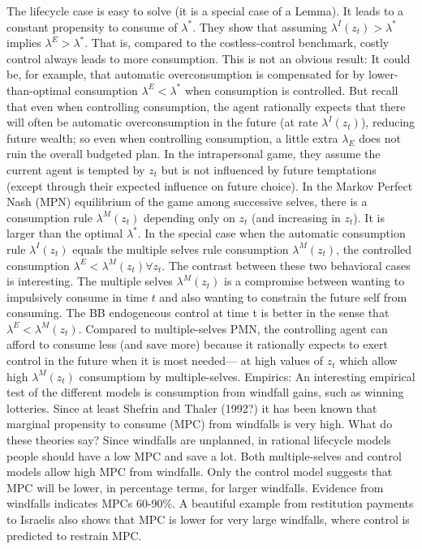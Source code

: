 \documentclass{article}
\begin{document}
The lifecycle case is easy to solve (it is a special case of a Lemma). It leads to a constant propensity to consume of $\lambda^*$. They show that assuming $\lambda^I(z_t)> \lambda^*$ implies $\lambda^E> \lambda^*$. That is, compared to the costless-control benchmark, costly control always leads to more consumption. This is not an obvious result: It could be, for example, that automatic overconsumption is compensated for by lower-than-optimal consumption $\lambda^E<\lambda^*$ when consumption is controlled. But recall that even when controlling consumption, the agent rationally expects that there will often be automatic overconsumption in the future (at rate $\lambda^I(z_t)$), reducing future wealth; so even when controlling consumption, a little extra $\lambda_E$ does not ruin the overall budgeted plan. In the intrapersonal game, they assume the current agent is tempted by $z_t$ but is not influenced by future temptations (except through their expected influence on future choice). In the Markov Perfect Nash (MPN) equilibrium of the game among successive selves, there is a consumption rule $\lambda^M(z_t)$ depending only on $z_t$ (and increasing in $z_t$). It is larger than the optimal $\lambda^*$. In the special case when the automatic consumption rule $\lambda^I(z_t)$ equals the multiple selves rule consumption $\lambda^M(z_t)$, the controlled consumption $\lambda^E < \lambda^M(z_t) \forall z_t$. The contrast between these two behavioral cases is interesting.  The multiple selves $\lambda^M(z_t)$ is a compromise between wanting to impulsively consume in time $t$ and also wanting to constrain the future self from consuming. The BB endogeneous control at time t is better in the sense that $\lambda^E < \lambda^M(z_t)$. Compared to multiple-selves PMN, the controlling agent can afford to consume less (and save more) because it rationally expects to exert control in the future when it is most needed— at high values of $z_t$ which allow high  $\lambda^M(z_t)$ consumptiom by multiple-selves. 
Empirics: An interesting empirical test of the different models is consumption from windfall gains, such as winning lotteries. Since at least Shefrin and Thaler (1992?) it has been known that marginal propensity to consume (MPC) from windfalls is very high. 
What do these theories say? Since windfalls are unplanned, in rational lifecycle models people should have a low MPC and save a lot.  Both multiple-selves and control models allow high MPC from windfalls. Only the control model suggests that MPC will be lower, in percentage terms, for larger windfalls. Evidence from windfalls indicates MPCs 60-90\%. A beautiful example from restitution payments to Israelis also shows that MPC is lower for very large windfalls, where control is predicted to restrain MPC.   
\end{document}
